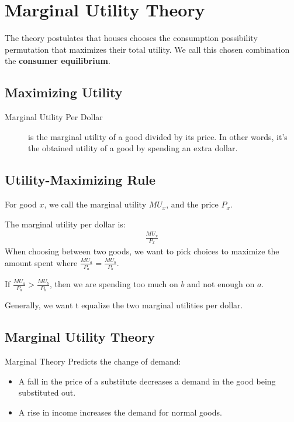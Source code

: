            \section{Marginal Utility Theory} %
            \label{sec:marginal_utility_theory}
                The theory postulates that houses chooses the consumption possibility permutation that maximizes their total utility.
                We call this chosen combination the \textbf{consumer equilibrium}.

                \subsection{Maximizing Utility} %
                \label{sub:maximizing_utility}
                    \begin{description}
                        \item[Marginal Utility Per Dollar] is the marginal utility of a good divided by its price.
                            In other words, it's the obtained utility of a good by spending an extra dollar.
                    \end{description}
                \subsection{Utility-Maximizing Rule} %
                \label{sub:utility_maximizing_rule}
                    For good $x$, we call the marginal utility $MU_x$, and the price $P_x$.

                    The marginal utility per dollar is:
                    \begin{align*}
                        \frac{MU_x}{P_x}
                    \end{align*}
                    When choosing between two goods, we want to pick choices to maximize the amount spent where $\frac{MU_a}{P_a} = \frac{MU_b}{P_b}$.

                    If $\frac{MU_a}{P_a} > \frac{MU_b}{P_b}$, then we are spending too much on $b$ and not enough on $a$.

                    Generally, we want t equalize the two marginal utilities per dollar.
                \subsection{Marginal Utility Theory} %
                \label{sub:marginal_utility_theory}
                    Marginal Theory Predicts the change of demand:
                    \begin{itemize}
                        \item A fall in the price of a substitute decreases a demand in the good being substituted out.
                        \item A rise in income increases the demand for normal goods.
                    \end{itemize}
